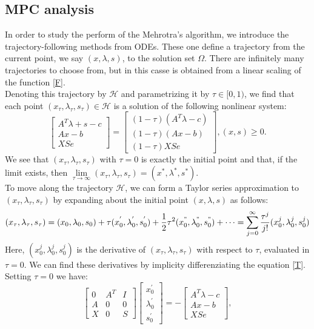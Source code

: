 \documentclass[a4paper,10 pt,titlepage,twoside]{book}
\theoremstyle{plain}
\theoremstyle{definition}
\theoremstyle{remark}
\begin{document}
\subsection*{MPC analysis}
In order to study the perform of the Mehrotra's algorithm, we introduce the trajectory-following methods from ODEs. These one define a trajectory from the current point, we say $(x,\lambda,s)$, to the solution set $\Omega$. There are infinitely many trajectories to choose from, but in this casse is obtained from a linear scaling of the function \ref{F}.\\ Denoting this trajectory by $\mathcal{H}$ and parametrizing it by $\tau\in[0,1)$, we find that each point $(x_{\tau},\lambda_{\tau},s_{\tau})\in\mathcal{H}$ is a solution of the following nonlinear system:
\begin{equation}\label{T}
	\begin{bmatrix}
	A^{T}\lambda+s-c \\Ax-b \\XSe
	\end{bmatrix}=\begin{bmatrix}
	(1-\tau)(A^{T}\lambda-c)\\(1-\tau)(Ax-b)\\(1-\tau)XSe
	\end{bmatrix}, (x,s)\geq0.
\end{equation}
We see that $(x_{\tau},\lambda_{\tau},s_{\tau})$ with $\tau = 0$ is exactly the initial point and that, if the limit exists, then $\lim\limits_{\tau\to\infty}(x_{\tau},\lambda_{\tau},s_{\tau}) = (x^{*},\lambda^{*},s^{*})$.\\
To move along the trajectory $\mathcal{H}$, we can form a Taylor series approximation to $(x_{\tau},\lambda_{\tau},s_{\tau})$ by expanding about the initial point  $(x,\lambda,s)$ as follows:
\begin{equation*}
(x_{\tau},\lambda_{\tau},s_{\tau})=(x_{0},\lambda_{0},s_{0})+\tau(x_{0}^{'},\lambda_{0}^{'},s_{0}^{'})+\frac{1}{2}\tau^{2}(x_{0}^{"},\lambda_{0}^{"},s_{0}^{"})+\dots = \sum_{j=0}^{\infty}\frac{\tau^{j}}{j!}(x_{0}^{j},\lambda_{0}^{j},s_{0}^{j})
\end{equation*}
Here, $(x_{0}^{j},\lambda_{0}^{j},s_{0}^{j})$ is the derivative of $(x_{\tau},\lambda_{\tau},s_{\tau})$ with respect to $\tau$, evaluated in $\tau = 0$. We can find these derivatives by implicity differenziating the equation \ref{T}. Setting $\tau=0$ we have:
\begin{equation}
\begin{bmatrix}
0&A^{T}&I \\A&0&0\\X&0&S
\end{bmatrix}\begin{bmatrix}
x_{0}^{'}\\\lambda_{0}^{'}\\s_{0}^{'}
\end{bmatrix}=-\begin{bmatrix}
A^{T}\lambda-c\\Ax-b\\XSe
\end{bmatrix},
\end{equation}
\end{document}
